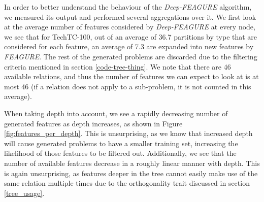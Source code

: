 \documentclass[twoside,11pt]{article}
\theoremstyle{definition}
\begin{document}

In order to better understand the behaviour of the \emph{Deep-FEAGURE} algorithm, we measured its output and performed several aggregations over it.
We first look at the average number of features considered by \emph{Deep-FEAGURE} at every node, we see that for TechTC-100, out of an average of 36.7 partitions by type that are considered for each feature, an average of 7.3 are expanded into new features by \emph{FEAGURE}. The rest of the generated problems are discarded due to the filtering criteria mentioned in section \ref{code-tree-thing}.
We note that there are 46 available relations, and thus the number of features we can expect to look at is at most 46 (if a relation does not apply to a sub-problem, it is not counted in this average). 

When taking depth into account, we see a rapidly decreasing number of generated features as depth increases, as shown in Figure \ref{fig:features_per_depth}.
This is unsurprising, as we know that increased depth will cause generated problems to have a smaller training set, increasing the likelihood of those features to be filtered out. Additionally, we see that the number of available features decrease in a roughly linear manner with depth. This is again unsurprising, as features deeper in the tree cannot easily make use of the same relation multiple times due to the orthogonality trait discussed in section \ref{tree_usage}.
\end{document}
